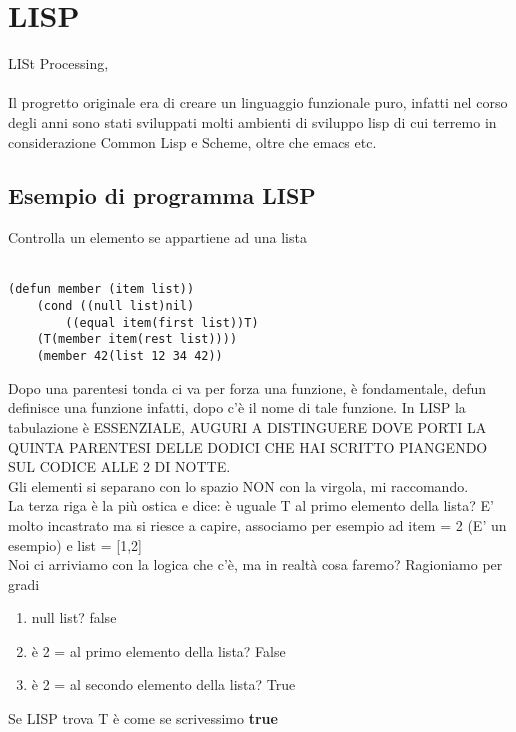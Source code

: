 \documentclass[12pt, a4paper, openany, oneside]{book}
\begin{document}
\section{LISP}
LISt Processing, \\ \\
Il progretto originale era di creare un linguaggio funzionale puro, infatti
nel corso degli anni sono stati sviluppati molti ambienti di sviluppo lisp
di cui terremo in considerazione Common Lisp e Scheme, oltre che emacs etc.
\subsection{Esempio di programma LISP}
Controlla un elemento se appartiene ad una lista \\ \\
\begin{lstlisting}[language=LISP]
(defun member (item list)) 
    (cond ((null list)nil) 
        ((equal item(first list))T) 
    (T(member item(rest list)))) 
    (member 42(list 12 34 42))
\end{lstlisting}
Dopo una parentesi tonda ci va per forza una funzione, è fondamentale, defun 
definisce una funzione infatti, dopo c'è il nome di tale funzione. In LISP la 
tabulazione è ESSENZIALE, AUGURI A DISTINGUERE DOVE PORTI LA QUINTA PARENTESI DELLE 
DODICI CHE HAI SCRITTO PIANGENDO SUL CODICE ALLE 2 DI NOTTE.
\\
Gli elementi si separano con lo spazio NON con la virgola, mi raccomando.
\\
La terza riga è la più ostica e dice: è uguale T al primo elemento della lista?
E' molto incastrato ma si riesce a capire, associamo per esempio ad item = 2
(E' un esempio) e list = [1,2] \\
Noi ci arriviamo con la logica che c'è, ma in realtà cosa faremo? Ragioniamo 
per gradi
\begin{enumerate}
	\item null list? \color{magenta} false \color{black}
	\item è 2 = al primo elemento della lista? \color{magenta} False \color{black}
	\item è 2 = al secondo elemento della lista? \color{blue}True \color{black}
\end{enumerate}
Se LISP trova T è come se scrivessimo  \color{blue}\textbf{true}\color{black}
\end{document}

